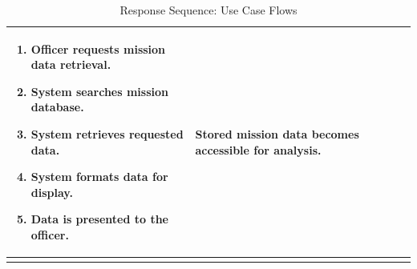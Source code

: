 \documentclass[11pt,a4paper]{article}
\begin{document}
\begin{longtable}{|>{\raggedright\arraybackslash}p{}|>{\raggedright\arraybackslash}p{}|>{\raggedright\arraybackslash}p{}|}
\begin{enumerate}[leftmargin=*,nosep]
  \item Officer requests mission data retrieval.
  \item System searches mission database.
  \item System retrieves requested data.
  \item System formats data for display.
  \item Data is presented to the officer.
\end{enumerate} & Stored mission data becomes accessible for analysis. \\
\hline
\caption{Response Sequence: Use Case Flows}\label{tab:response-sequence}
\end{longtable}
\setlength{\tabcolsep}{6pt}
\normalsize

\clearpage
{}
\label{app:dd-response-sequence}

\small
\renewcommand{\arraystretch}{1.2}
\setlength{\tabcolsep}{4pt}
\end{document}
